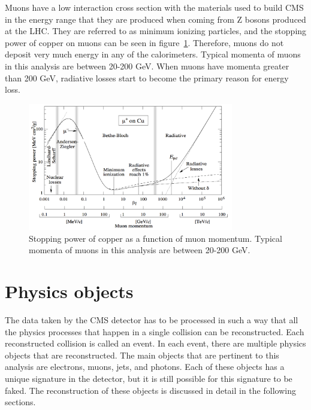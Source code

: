 Muons have a low interaction cross section with the materials used to build CMS in the energy range that they are produced when coming from Z bosons produced at the LHC.
They are referred to as minimum ionizing particles, and the stopping power of copper on muons can be seen in figure~\ref{fig:muonenergyloss}.
Therefore, muons do not deposit very much energy in any of the calorimeters.
Typical momenta of muons in this analysis are between 20-200 GeV.
When muons have momenta greater than 200 GeV, radiative losses start to become the primary reason for energy loss.

\begin{figure}[!htb]
  \begin{center}
    \includegraphics[width=0.8\textwidth]{cms/figs/muon_energy_loss.pdf}
    \caption{
      \label{fig:muonenergyloss}
      Stopping power of copper as a function of muon momentum. Typical momenta of muons in this analysis are between 20-200 GeV.
    }
  \end{center}
\end{figure}

\section{Physics objects}
The data taken by the CMS detector has to be processed in such a way that all the physics processes that happen in a single collision can be reconstructed.
Each reconstructed collision is called an event.
In each event, there are multiple physics objects that are reconstructed.
The main objects that are pertinent to this analysis are electrons, muons, jets, and photons.
Each of these objects has a unique signature in the detector, but it is still possible for this signature to be faked.
The reconstruction of these objects is discussed in detail in the following sections.

